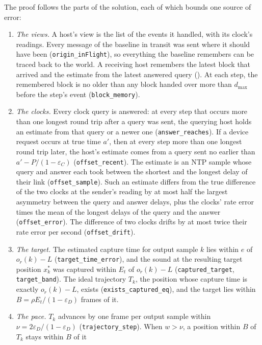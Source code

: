 \documentclass[11pt,a4paper]{article}
\newcommand{\lean}[1]{\texttt{#1}}
\theoremstyle{definition}
\begin{document}
The proof follows the parts of the solution, each of which bounds one
source of error:
\begin{enumerate}
\item \emph{The views.} A host's view is the list of the events it handled,
  with its clock's readings. Every message of the baseline in transit was
  sent where it should have been (\lean{origin\_inFlight}), so everything
  the baseline remembers can be traced back to the world. A receiving host
  remembers the latest block that arrived and the estimate from the latest
  answered query (). At
  each step, the remembered block is no older than any block handed over
  more than $d_{\max}$ before the step's event (\lean{block\_memory}).
\item \emph{The clocks.} Every clock query is answered: at every step that
  occurs more than one longest round trip after a query was sent, the
  querying host holds an estimate from that query or a newer one
  (\lean{answer\_reaches}). If a device request occurs at true time $a'$,
  then at every step more than one longest round trip later, the host's
  estimate comes from a query sent no earlier than
  $a' - P/(1 - \varepsilon_C)$ (\lean{offset\_recent}). The estimate is an
  NTP sample whose query and answer each took between the shortest and the
  longest delay of their link (\lean{offset\_sample}). Such an estimate
  differs from the true difference of the two clocks at the sender's
  reading by at most half the largest asymmetry between the query and
  answer delays, plus the clocks' rate error times the mean of the longest
  delays of the query and the answer (\lean{offset\_error}). The difference
  of two clocks drifts by at most twice their rate error per second
  (\lean{offset\_drift}).
\item \emph{The target.} The estimated capture time for output sample $k$
  lies within $e$ of $o_r(k) - L$ (\lean{target\_time\_error}), and the
  sound at the resulting target position $x^*_k$ was captured within $E_t$
  of $o_r(k) - L$ (\lean{captured\_target}, \lean{target\_band}). The
  ideal trajectory $T_k$, the position whose capture time is exactly
  $o_r(k) - L$, exists (\lean{exists\_captured\_eq}), and the target lies
  within $B = \rho E_t/(1 - \varepsilon_D)$ frames of it.
\item \emph{The pace.} $T_k$ advances by one frame per output sample within
  $\nu = 2\varepsilon_D/(1 - \varepsilon_D)$ (\lean{trajectory\_step}).
  When $w > \nu$, a position within $B$ of $T_k$ stays within $B$ of it

\end{enumerate}
\end{document}
